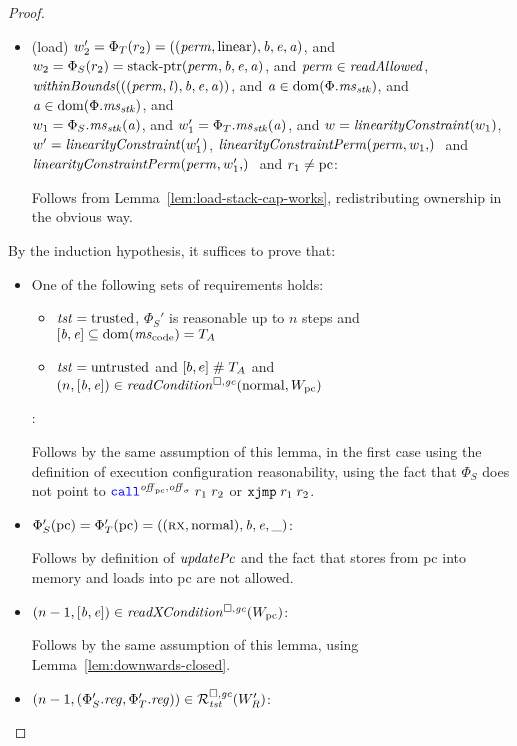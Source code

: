 \begin{proof}
\begin{itemize}
  \item (load) $ w_2' = \Phi_T(r_2) =
        ((\mathit{perm},\mathrm{linear}),\mathit{b},\mathit{e},\mathit{a})$, and $w_2 = \Phi_S(r_2) =
        \mathrm{stack\text{-}ptr}(\mathit{perm},\mathit{b},\mathit{e},\mathit{a})$, and $\perm \in \readAllowed{}$,
        $\withinBounds{((\perm,\lin),\baddr,\eaddr,\aaddr)}$, and $\mathit{a} \in
        \mathrm{dom}(\Phi.\mathit{ms}_{\mathit{stk}})$, and $\mathit{a} \in \mathrm{dom}(\Phi.\mathit{ms}_{\mathit{stk}})$, and\\
        $w_1 = \Phi_S.\mathit{ms}_{\mathit{stk}}(\mathit{a})$, and $w_1' = \Phi_T.\mathit{ms}_{\mathit{stk}}(\mathit{a})$, and $w = \linCons{w_1}$, $w' = \linCons{w_1'}$, $\linConsPerm{\perm,w_1}$ and $\linConsPerm{\perm,w_1'}$ and $r_1 \neq \mathrm{pc}$:

    Follows from Lemma~\ref{lem:load-stack-cap-works}, redistributing ownership in the obvious way.

  \end{itemize}

  By the induction hypothesis, it suffices to prove that:
  \begin{itemize}
  \item One of the following sets of requirements holds:
    \begin{itemize}
    \item $\mathit{tst} = \mathrm{trusted}$, $\Phi_S'$ is reasonable up to $n$ steps and $[\baddr,\eaddr] \subseteq \dom(\mscode) = \ta$
    \item $\mathit{tst} = \mathrm{untrusted}$ and $[b,e] \mathrel{\#} T_{A}$ and $\npair{[\baddr,\eaddr]} \in \readCond{\normal,W_\pcreg}$
    \end{itemize}:

    Follows by the same assumption of this lemma, in the first case using the definition of execution configuration reasonability, using the fact that $\Phi_S$ does not point to $\scall{\offpc,\offsigma}{r_1}{r_2}$ or $\txjmp{r_1}{r_2}$.

  \item $\Phi_S'(\mathrm{pc}) = \Phi_T'(\mathrm{pc}) = ((\textsc{rx},\mathrm{normal}),\mathit{b},\mathit{e},\_)$:

    Follows by definition of $\updPcAddr{}$ and the fact that stores from pc into memory and loads into pc are not allowed.

  \item $\npair[n-1]{[\baddr,\eaddr]} \in \xReadCond{W_\pcreg}$:

    Follows by the same assumption of this lemma, using Lemma~\ref{lem:downwards-closed}.

  \item $\npair[n-1]{(\Phi_S'.\reg,\Phi_T'.\reg)} \in \lrrg{\trust}(W_R')$:


\end{itemize}
\end{proof}
